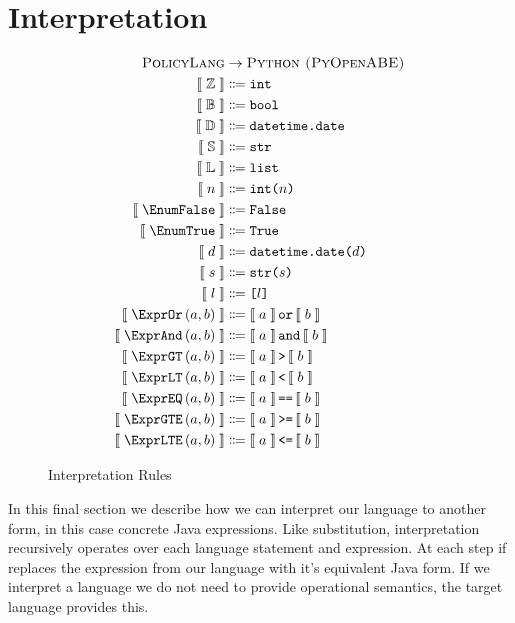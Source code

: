 \section{Interpretation}\label{sec:interpretation}

\begin{figure}[ht]
  \centering
\begin{align*}
  \textsc{PolicyLang}&\rightarrow\textsc{Python (PyOpenABE)}\\
  \interpB{\TyInt}&\Coloneqq\text{\ttfamily int}\\
  \interpB{\mathbb{B}}&\Coloneqq\text{\ttfamily bool}\\
  \interpB{\mathbb{D}}&\Coloneqq\text{\ttfamily datetime.date}\\
  \interpB{\mathbb{S}}&\Coloneqq\text{\ttfamily str}\\
  \interpB{\mathbb{L}}&\Coloneqq\text{\ttfamily list}\\
  \interpB{n}&\Coloneqq\text{\ttfamily int(}n\text{\ttfamily)}\\
  \interpB{\EnumFalse}&\Coloneqq\text{\ttfamily False}\\
  \interpB{\EnumTrue} &\Coloneqq\text{\ttfamily True}\\
  \interpB{d}&\Coloneqq\text{\ttfamily datetime.date(}d\text{\ttfamily)}\\
  \interpB{s}&\Coloneqq\text{\ttfamily str(}s\text{\ttfamily)}\\
  \interpB{l}&\Coloneqq\text{\ttfamily [}l\text{\ttfamily]}\\
  \interpB{\exprOr{a}{b}}  &\Coloneqq\interpB{a}\,\text{\ttfamily or}\,\interpB{b}\\
  \interpB{\exprAnd{a}{b}} &\Coloneqq\interpB{a}\,\text{\ttfamily and}\,\interpB{b}\\
  \interpB{\exprGT{a}{b}}  &\Coloneqq\interpB{a}\,\text{\ttfamily \textgreater}\,\interpB{b}\\
  \interpB{\exprLT{a}{b}}  &\Coloneqq\interpB{a}\,\text{\ttfamily \textless}\,\interpB{b}\\
  \interpB{\exprEQ{a}{b}}  &\Coloneqq\interpB{a}\,\text{\ttfamily ==}\,\interpB{b}\\
  \interpB{\exprGTE{a}{b}}  &\Coloneqq\interpB{a}\,\text{\ttfamily \textgreater =}\,\interpB{b}\\
  \interpB{\exprLTE{a}{b}}  &\Coloneqq\interpB{a}\,\text{\ttfamily \textless =}\,\interpB{b}
\end{align*}
  \caption{\label{fig:interp}Interpretation Rules}
\end{figure}

In this final section we describe how we can interpret our language to another form, in this case concrete Java expressions.
Like substitution, interpretation recursively operates over each language statement and expression.
At each step if replaces the expression from our language with it's equivalent Java form.
If we interpret a language we do not need to provide operational semantics, the target language provides this.
